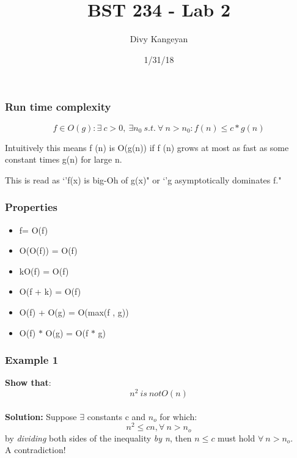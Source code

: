 \documentclass{beamer}
\title[BST 234 Lab 2]{BST 234 - Lab 2} %
\author{Divy Kangeyan} %
\institute[ ] %
{
  \\ %
\medskip
\textit{ } %
}
\date{1/31/18}%
\begin{document}
\begin{frame}
\titlepage %
\end{frame}

 

 
 
\begin{frame}
\frametitle{Run time complexity}
 
$$f \in O(g) : \exists \ c>0, \ \exists n_{0} \ s.t. \ \forall \ n>n_{0} : f (n) \le  c*g(n)$$
 
\vspace{1.3cm}
Intuitively this means f (n) is O(g(n)) if f (n) grows at most as fast
as some constant times g(n) for large n. 


This is read as `'f(x) is big-Oh of g(x)" or `'g asymptotically dominates f."
 

\end{frame}



\begin{frame}
\frametitle{Properties}

\begin{itemize}
\item f= O(f) %
\item O(O(f)) = O(f)
\item kO(f) = O(f)
\item O(f + k) = O(f)
\item O(f) + O(g) = O(max(f , g))
\item O(f) $*$ O(g) = O(f $*$ g)
\end{itemize}

\end{frame}

 

\begin{frame}
\frametitle{Example 1}
 \textbf{Show that}: $$n^{2} \ is \ not O(n) $$\\
 
\textbf{Solution:} Suppose $\exists$ constants c and
$n_{o}$ for which: $$n^{2}\leq cn, \forall \ n > n_{o} $$ 
by \textit{dividing} both sides of the inequality \textit{by n},
then $n\leq c$ must hold $\forall \ n>n_{o}$.   \\

A contradiction!

\end{frame}
\end{document}
